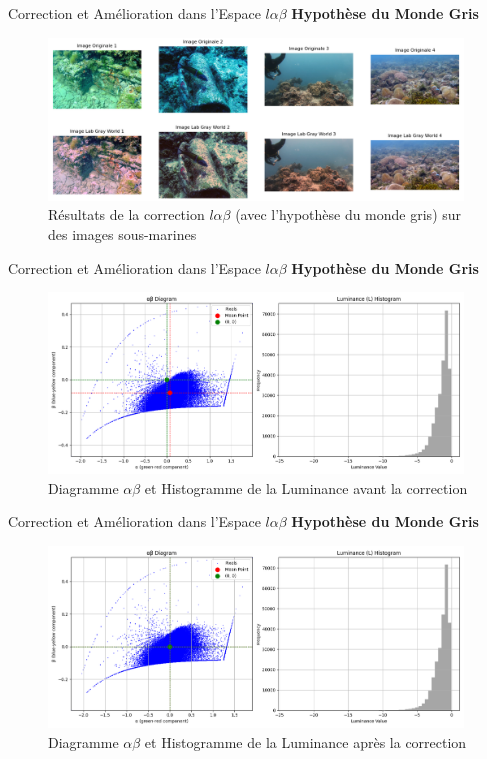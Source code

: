 \documentclass[8pt,a4paper]{beamer}
\numberwithin{figure}{section}
\begin{document}
\begin{frame}{Correction et Amélioration dans l'Espace \( l\alpha\beta \)}
\textbf{Hypothèse du Monde Gris}
\vspace{3mm}
\begin{figure}[h!]
\begin{center}
\includegraphics[width=11cm]{image006.png}
\end{center}
\label{figure3.1}
\caption{Résultats de la correction $l\alpha\beta$ (avec l'hypothèse du monde gris) sur des images sous-marines}
\end{figure}
\end{frame}

\begin{frame}{Correction et Amélioration dans l'Espace \( l\alpha\beta \)}
\textbf{Hypothèse du Monde Gris}
\begin{figure}[h!]
\begin{center}
\includegraphics[width=11cm]{image007.png}
\end{center}
\label{figure3.2}
\caption{Diagramme $\alpha\beta$ et Histogramme de la Luminance avant la correction}
\end{figure}
\end{frame}

\begin{frame}{Correction et Amélioration dans l'Espace \( l\alpha\beta \)}
\textbf{Hypothèse du Monde Gris}
\begin{figure}[h!]
\begin{center}
\includegraphics[width=11cm]{image008.png}
\end{center}
\label{figure3.3}
\caption{Diagramme $\alpha\beta$ et Histogramme de la Luminance après la correction}
\end{figure}
\end{frame}
\end{document}
